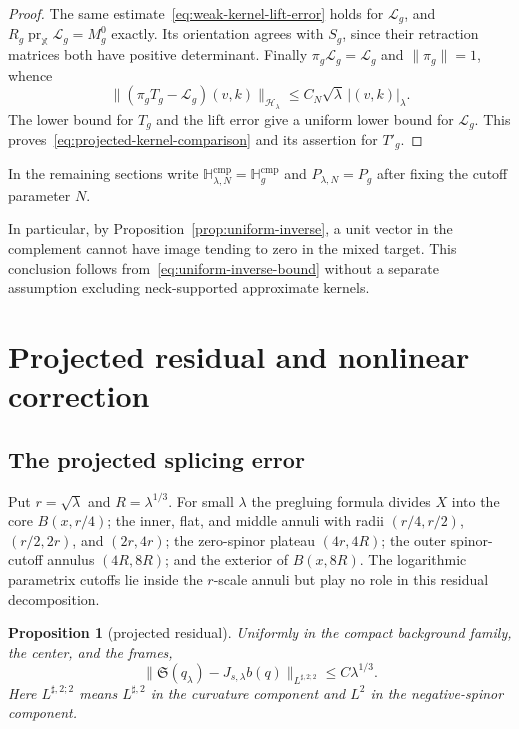 \documentclass[11pt]{amsart}
\newtheorem{proposition}[theorem]{Proposition}
\theoremstyle{definition}
\theoremstyle{remark}
\theoremstyle{plain}
\begin{document}
\begin{proof}
The same estimate~\eqref{eq:weak-kernel-lift-error} holds for $\mathcal L_g$,
and $R_g\operatorname{pr}_{\mathbb X}\mathcal L_g=M_g^0$ exactly.  Its
orientation agrees with $S_g$, since their retraction matrices both
have positive determinant.  Finally $\pi_g\mathcal L_g=\mathcal L_g$ and
$\|\pi_g\|=1$, whence
\[
 \|(\pi_gT_g-\mathcal L_g)(v,k)\|_{\mathcal H_\lambda}
 \leq C_N\sqrt\lambda\,|(v,k)|_\lambda.
\]
The lower bound for $T_g$ and the lift error give a uniform lower
bound for $\mathcal L_g$.  This proves~\eqref{eq:projected-kernel-comparison}
and its assertion for $T'_g$.
\end{proof}

In the remaining sections write
$\mathbb H^{\mathrm{cmp}}_{\lambda,N}=\mathbb H_g^{\mathrm{cmp}}$ and
$P_{\lambda,N}=P_g$ after fixing the cutoff parameter $N$.

In particular, by Proposition~\ref{prop:uniform-inverse}, a unit vector in the
complement cannot have image tending to zero in the mixed target.  This
conclusion follows from~\eqref{eq:uniform-inverse-bound} without a
separate assumption excluding neck-supported approximate kernels.

\section{Projected residual and nonlinear correction}\label{sec:correction}

\subsection{The projected splicing error}
Put $r=\sqrt\lambda$ and $R=\lambda^{1/3}$.  For small $\lambda$ the
pregluing formula divides $X$ into the core $B(x,r/4)$; the inner, flat, and
middle annuli with radii $(r/4,r/2)$, $(r/2,2r)$, and $(2r,4r)$; the
zero-spinor plateau $(4r,4R)$; the outer spinor-cutoff annulus $(4R,8R)$; and
the exterior of $B(x,8R)$.  The logarithmic parametrix cutoffs lie inside the
$r$-scale annuli but play no role in this residual decomposition.

\begin{proposition}[projected residual]\label{prop:residual}
Uniformly in the compact background family, the center, and the frames,
\begin{equation}\label{eq:residual}
 \|\mathfrak S(q_\lambda)-J_{s,\lambda}b(q)\|_{L^{\sharp,2;2}}
 \leq C\lambda^{1/3}.
\end{equation}
Here $L^{\sharp,2;2}$ means $L^{\sharp,2}$ in the curvature component and
$L^2$ in the negative-spinor component.
\end{proposition}
\end{document}
